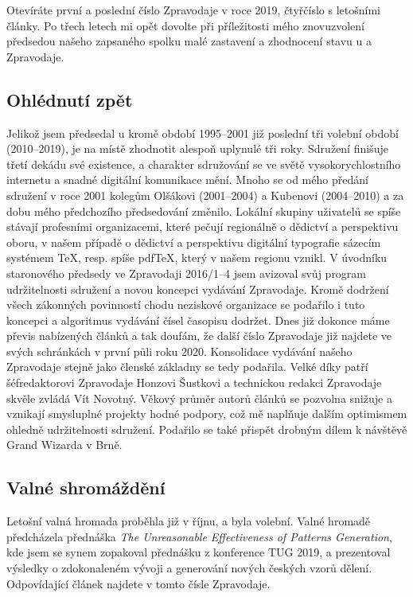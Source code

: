 Otevíráte první a poslední číslo Zpravodaje v roce 2019, čtyřčíslo s letošními články.  Po třech letech mi opět dovolte při příležitosti mého znovuzvolení předsedou našeho zapsaného spolku malé zastavení a zhodnocení stavu \CSTUG\unskip u a Zpravodaje.
\subsection*{Ohlédnutí zpět}
Jelikož jsem předsedal \CSTUG u kromě období 1995--2001 již poslední tři volební období (2010--2019), je na místě zhodnotit alespoň uplynulé tři roky.  Sdružení finišuje třetí dekádu své existence, a charakter sdružování se ve světě vysokorychlostního internetu a snadné digitální komunikace mění. Mnoho se od mého předání sdružení v roce 2001 kolegům Olšákovi (2001--2004) a Kubenovi (2004--2010) a za dobu mého předchozího předsedování změnilo.
Lokální skupiny uživatelů se spíše stávají profesními organizacemi, které pečují regionálně o dědictví a perspektivu oboru, v našem případě o dědictví a perspektivu digitální typografie sázecím systémem \TeX, resp. spíše pdf\TeX, který v našem regionu vznikl.
V úvodníku staronového předsedy ve {Zpravodaji 2016/1--4} jsem avizoval svůj program udržitelnosti sdružení a novou koncepci vydávání Zpravodaje.  Kromě dodržení všech zákonných povinností chodu neziskové organizace se podařilo i tuto koncepci a algoritmus vydávání čísel časopisu dodržet.  Dnes již dokonce máme převis nabízených článků a tak doufám, že další číslo Zpravodaje již najdete ve svých schránkách v první půli roku 2020.  Konsolidace vydávání našeho Zpravodaje stejně jako členské základny se tedy podařila.  Velké díky patří šéfredaktorovi Zpravodaje Honzovi Šustkovi a technickou redakci Zpravodaje skvěle zvládá Vít Novotný.  Věkový průměr autorů článků se pozvolna snižuje a vznikají smysluplné projekty hodné podpory, což mě naplňuje dalším optimismem ohledně udržitelnosti sdružení.  Podařilo se také přispět drobným dílem k návštěvě Grand Wizarda v Brně.
\subsection*{Valné shromáždění}
Letošní valná hromada proběhla již v říjnu, a byla volební.  Valné hromadě předcházela přednáška \emph{The Unreasonable Effectiveness of Patterns Generation}, kde jsem se synem zopakoval přednášku z konference TUG 2019, a prezentoval výsledky o zdokonaleném vývoji a generování nových českých vzorů dělení. Odpovídající článek najdete v tomto čísle Zpravodaje.
